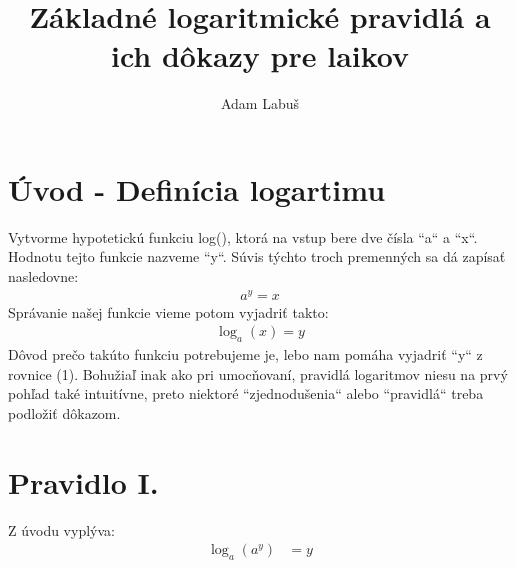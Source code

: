 \documentclass{article}
\title{Základné logaritmické pravidlá a ich dôkazy pre laikov}
\author{Adam Labuš}
\begin{document}
\begin{titlepage}
	\maketitle
\end{titlepage}

\large
\section{Úvod - Definícia logartimu}
Vytvorme hypotetickú funkciu log(), ktorá na vstup bere dve čísla ``a`` a ``x``. Hodnotu tejto funkcie nazveme ``y``. Súvis týchto troch premenných sa dá zapísať nasledovne: \\
\begin{align}
	a^y = x
\end{align}
Správanie našej funkcie vieme potom vyjadriť takto: \\
\begin{align}
	\log_a(x) = y
\end{align}
Dôvod prečo takúto funkciu potrebujeme je, lebo nam pomáha vyjadriť ``y`` z rovnice (1). Bohužiaľ inak ako pri umocňovaní, pravidlá logaritmov niesu na prvý pohľad také intuitívne, preto niektoré ``zjednodušenia`` alebo ``pravidlá`` treba podložiť dôkazom.


\section*{Pravidlo I.}
Z úvodu vyplýva: \\
\begin{align}
	\log_a(a^y) & = y \tag{dosadili sme si x}
\end{align}
\end{document}
